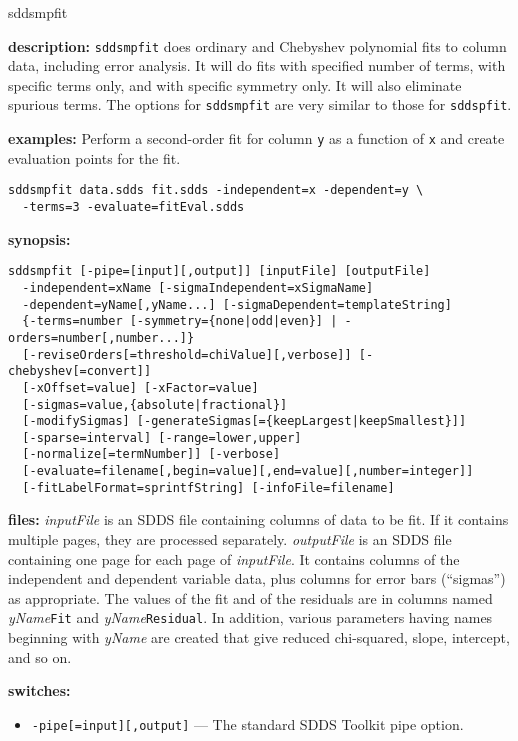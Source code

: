 \begin{sddsprog}{sddsmpfit}
  \item \textbf{description:}
  \verb|sddsmpfit| does ordinary and Chebyshev polynomial fits to column data,
  including error analysis. It will do fits with specified number of terms,
  with specific terms only, and with specific symmetry only. It will also
  eliminate spurious terms. The options for \verb|sddsmpfit| are very similar
  to those for \verb|sddspfit|.
  \item \textbf{examples:}
  Perform a second-order fit for column \verb|y| as a function of \verb|x| and
  create evaluation points for the fit.
  \begin{verbatim}
sddsmpfit data.sdds fit.sdds -independent=x -dependent=y \
  -terms=3 -evaluate=fitEval.sdds
  \end{verbatim}
  \item \textbf{synopsis:}
  \begin{verbatim}
sddsmpfit [-pipe=[input][,output]] [inputFile] [outputFile]
  -independent=xName [-sigmaIndependent=xSigmaName]
  -dependent=yName[,yName...] [-sigmaDependent=templateString]
  {-terms=number [-symmetry={none|odd|even}] | -orders=number[,number...]}
  [-reviseOrders[=threshold=chiValue][,verbose]] [-chebyshev[=convert]]
  [-xOffset=value] [-xFactor=value]
  [-sigmas=value,{absolute|fractional}]
  [-modifySigmas] [-generateSigmas[={keepLargest|keepSmallest}]]
  [-sparse=interval] [-range=lower,upper]
  [-normalize[=termNumber]] [-verbose]
  [-evaluate=filename[,begin=value][,end=value][,number=integer]]
  [-fitLabelFormat=sprintfString] [-infoFile=filename]
  \end{verbatim}
  \item \textbf{files:}
  \emph{inputFile} is an SDDS file containing columns of data to be fit.
  If it contains multiple pages, they are processed separately.
  \emph{outputFile} is an SDDS file containing one page for each page of
  \emph{inputFile}. It contains columns of the independent and dependent
  variable data, plus columns for error bars (``sigmas'') as appropriate.
  The values of the fit and of the residuals are in columns named
  \emph{yName}\verb|Fit| and \emph{yName}\verb|Residual|. In addition,
  various parameters having names beginning with \emph{yName} are created
  that give reduced chi-squared, slope, intercept, and so on.
  \item \textbf{switches:}
    \begin{itemize}
    \item \verb|-pipe[=input][,output]| --- The standard SDDS Toolkit pipe option.

\end{itemize}
\end{sddsprog}
